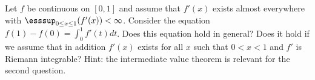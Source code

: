 Let $f$ be continuous on $[0,1]$ and assume that $f'(x)$ exists almost
everywhere with $\esssup_{0\leq x\leq 1}(f'(x))<\infty$. Consider the
equation $f(1)-f(0)=\int_0^1 f'(t) dt$. Does this equation hold in
general? Does it hold if we assume that in addition $f'(x)$ exists for
all $x$ such that $0<x<1$ and $f'$ is Riemann integrable? Hint: the
intermediate value theorem is relevant for the second question.

